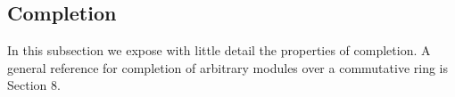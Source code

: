 \subsection*{Completion}
In this subsection we expose with little detail the properties of completion. A general reference for completion of arbitrary modules over a commutative ring is \cite{Matsumura} Section 8. 
%
